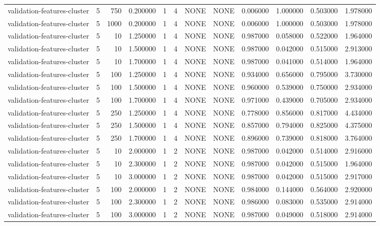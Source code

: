 \begin{tabular}{lrrrllllrrrr}
validation-features-cluster & 5 & 750 & 0.200000 & 1 & 4 & NONE & NONE & 0.006000 & 1.000000 & 0.503000 & 1.978000 \\
validation-features-cluster & 5 & 1000 & 0.200000 & 1 & 4 & NONE & NONE & 0.006000 & 1.000000 & 0.503000 & 1.978000 \\
validation-features-cluster & 5 & 10 & 1.250000 & 1 & 4 & NONE & NONE & 0.987000 & 0.058000 & 0.522000 & 1.964000 \\
validation-features-cluster & 5 & 10 & 1.500000 & 1 & 4 & NONE & NONE & 0.987000 & 0.042000 & 0.515000 & 2.913000 \\
validation-features-cluster & 5 & 10 & 1.700000 & 1 & 4 & NONE & NONE & 0.987000 & 0.041000 & 0.514000 & 1.964000 \\
validation-features-cluster & 5 & 100 & 1.250000 & 1 & 4 & NONE & NONE & 0.934000 & 0.656000 & 0.795000 & 3.730000 \\
validation-features-cluster & 5 & 100 & 1.500000 & 1 & 4 & NONE & NONE & 0.960000 & 0.539000 & 0.750000 & 2.934000 \\
validation-features-cluster & 5 & 100 & 1.700000 & 1 & 4 & NONE & NONE & 0.971000 & 0.439000 & 0.705000 & 2.934000 \\
validation-features-cluster & 5 & 250 & 1.250000 & 1 & 4 & NONE & NONE & 0.778000 & 0.856000 & 0.817000 & 4.434000 \\
validation-features-cluster & 5 & 250 & 1.500000 & 1 & 4 & NONE & NONE & 0.857000 & 0.794000 & 0.825000 & 4.375000 \\
validation-features-cluster & 5 & 250 & 1.700000 & 1 & 4 & NONE & NONE & 0.896000 & 0.739000 & 0.818000 & 3.764000 \\
validation-features-cluster & 5 & 10 & 2.000000 & 1 & 2 & NONE & NONE & 0.987000 & 0.042000 & 0.514000 & 2.916000 \\
validation-features-cluster & 5 & 10 & 2.300000 & 1 & 2 & NONE & NONE & 0.987000 & 0.042000 & 0.515000 & 1.964000 \\
validation-features-cluster & 5 & 10 & 3.000000 & 1 & 2 & NONE & NONE & 0.987000 & 0.042000 & 0.515000 & 2.917000 \\
validation-features-cluster & 5 & 100 & 2.000000 & 1 & 2 & NONE & NONE & 0.984000 & 0.144000 & 0.564000 & 2.920000 \\
validation-features-cluster & 5 & 100 & 2.300000 & 1 & 2 & NONE & NONE & 0.986000 & 0.083000 & 0.535000 & 2.914000 \\
validation-features-cluster & 5 & 100 & 3.000000 & 1 & 2 & NONE & NONE & 0.987000 & 0.049000 & 0.518000 & 2.914000 \\

\end{tabular}
